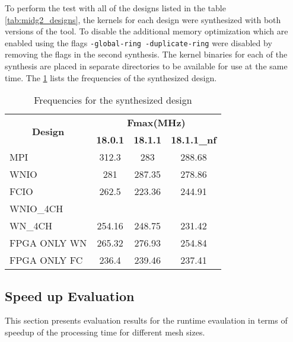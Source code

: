 To perform the test with all of the designs listed in the table \ref{tab:midg2_designs},
the kernels for each design were synthesized with both versions of the tool. To disable
the additional memory optimization which are enabled using the flags \texttt{-global-ring -duplicate-ring}
were disabled by removing the flags in the second synthesis. The kernel binaries for each
of the synthesis are placed in separate directories to be available for use at the same time.
The \ref{tab:syn_freq} lists the frequencies of the synthesized design.

\begin{table}[ht]
    \centering
    \caption{Frequencies for the synthesized design }
    \label{tab:syn_freq}
    \begin{tabular}{lccc}
    \multicolumn{1}{c}{\multirow{2}{*}{\textbf{Design}}} & \multicolumn{3}{c}{\textbf{Fmax(MHz)}} \\
    \cline{2-4}
    \multicolumn{1}{c}{} & \textbf{18.0.1} & \textbf{18.1.1} & \textbf{18.1.1\_nf} \\
    \hline
    MPI & 312.3 & 283 & 288.68 \\
    WNIO & 281 & 287.35 & 278.86 \\
    FCIO & 262.5 & 223.36 & 244.91 \\
    WNIO\_4CH &  &  &  \\
    WN\_4CH & 254.16 & 248.75 & 231.42 \\
    FPGA ONLY WN & 265.32 & 276.93 & 254.84 \\
    FPGA ONLY FC & 236.4 & 239.46 & 237.41
    \end{tabular}%
\end{table}


\subsection{Speed up Evaluation}

This section presents evaluation results for the runtime evaulation
in terms of speedup of the processing time for different mesh sizes.

